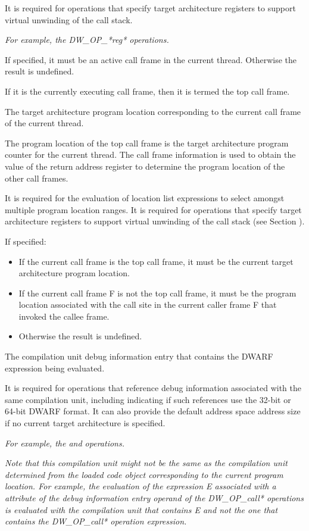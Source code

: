 \begin{enumerate}[1. ]
It is required for operations that specify target architecture
registers to support virtual unwinding of the call stack.

\textit{For example, the DW\_OP\_*reg* operations.}

If specified, it must be an active call frame in the current
thread. Otherwise the result is undefined.

If it is the currently executing call frame, then it is termed the top
call frame.

The target architecture program location corresponding to the current
call frame of the current thread.

The program location of the top call frame is the target architecture
program counter for the current thread. The call frame information is
used to obtain the value of the return address register to determine
the program location of the other call frames.

It is required for the evaluation of location list expressions to
select amongst multiple program location ranges. It is required for
operations that specify target architecture registers to support
virtual unwinding of the call stack (see Section
).

If specified:
\begin{itemize}
\item If the current call frame is the top call frame, it must be the
current target architecture program location.
\item If the current call frame F is not the top call frame, it must
be the program location associated with the call site in the current
caller frame F that invoked the callee frame.
\item Otherwise the result is undefined.
\end{itemize}

The compilation unit debug information entry that contains the DWARF
expression being evaluated.

It is required for operations that reference debug information
associated with the same compilation unit, including indicating if
such references use the 32-bit or 64-bit DWARF format. It can also
provide the default address space address size if no current target
architecture is specified.

\textit{For example, the \DWOPconstx{} and \DWOPaddrx{} operations.}

\textit{Note that this compilation unit might not be the same as the
compilation unit determined from the loaded code object
corresponding to the current program location. For example, the
evaluation of the expression E associated with a \DWATlocation
attribute of the debug information entry operand of the DW\_OP\_call*
operations is evaluated with the compilation unit that contains E
and not the one that contains the DW\_OP\_call* operation expression.}


\end{enumerate}
